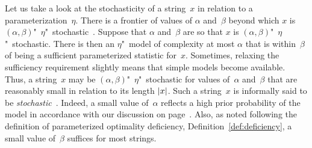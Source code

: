 Let us take a look at the stochasticity of a string~$x$ in relation to a parameterization~$\eta$.
There is a frontier of values of $\alpha$ and~$\beta$ beyond which $x$ is $(\alpha, \beta)$"~$\eta$"~stochastic~\parencite{vereshchagin2004kolmogorov,gacs2001algorithmic}.
Suppose that $\alpha$ and~$\beta$ are so that $x$ is $(\alpha, \beta)$"~$\eta$"~stochastic.
There is then an $\eta$"~model of complexity at most $\alpha$ that is within~$\beta$ of being a sufficient parameterized statistic for~$x$.
Sometimes, relaxing the sufficiency requirement slightly means that simple models become available.
Thus, a string~$x$ may be $(\alpha, \beta)$"~$\eta$"~stochastic for values of~$\alpha$ and~$\beta$ that are reasonably small in relation to its length ${\lvert x\rvert}$.
Such a string~$x$ is informally said to be \emph{stochastic}~\parencite{vereshchagin2017algorithmic}.
Indeed, a small value of~$\alpha$ reflects a high prior probability of the model in accordance with our discussion on page~\pageref{p:inference}.
Also, as noted following the definition of parameterized optimality deficiency, Definition~\ref{def:deficiency}, a small value of~$\beta$ suffices for most strings.

